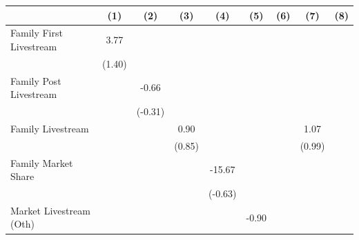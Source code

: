 {
\def\sym#1{\ifmmode^{#1}\else\(^{#1}\)\fi}
\begin{tabular}{l*{8}{c}}
\toprule
                    &\multicolumn{1}{c}{(1)}         &\multicolumn{1}{c}{(2)}         &\multicolumn{1}{c}{(3)}         &\multicolumn{1}{c}{(4)}         &\multicolumn{1}{c}{(5)}         &\multicolumn{1}{c}{(6)}         &\multicolumn{1}{c}{(7)}         &\multicolumn{1}{c}{(8)}         \\
\midrule
Family First Livestream&        3.77         &                     &                     &                     &                     &                     &                     &                     \\
                    &      (1.40)         &                     &                     &                     &                     &                     &                     &                     \\
\addlinespace
Family Post Livestream&                     &       -0.66         &                     &                     &                     &                     &                     &                     \\
                    &                     &     (-0.31)         &                     &                     &                     &                     &                     &                     \\
\addlinespace
Family Livestream   &                     &                     &        0.90         &                     &                     &                     &        1.07         &                     \\
                    &                     &                     &      (0.85)         &                     &                     &                     &      (0.99)         &                     \\
\addlinespace
Family Market Share &                     &                     &                     &      -15.67         &                     &                     &                     &                     \\
                    &                     &                     &                     &     (-0.63)         &                     &                     &                     &                     \\
\addlinespace
Market Livestream (Oth)&                     &                     &                     &                     &       -0.90         &                     &                     &                     \\

\end{tabular}}
